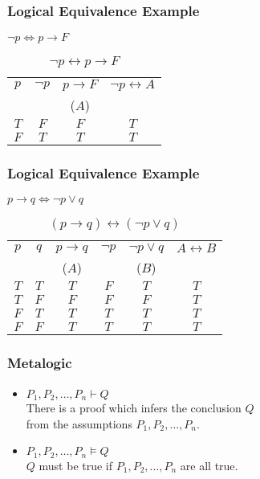 \documentclass[dvipsnames]{beamer}
\begin{document}
\begin{frame}
  \frametitle{Logical Equivalence Example}

  $\neg p \Leftrightarrow p \rightarrow F$

  \begin{table}
    \caption{$\neg p \leftrightarrow p \rightarrow F$}
    \begin{tabular}{|c|c|c||c|}\hline
      $p$ & $\neg p$ & $p \rightarrow F$ & $\neg p \leftrightarrow A$\\
          &          & ($A$)             &\\\hline\hline
      $T$ & $F$ & $F$ & $T$\\\hline
      $F$ & $T$ & $T$ & $T$\\\hline
    \end{tabular}
  \end{table}
\end{frame}

\begin{frame}
  \frametitle{Logical Equivalence Example}

  $p \rightarrow q \Leftrightarrow \neg p \vee q$

  \begin{table}
    \caption{$(p \rightarrow q) \leftrightarrow (\neg p \vee q)$}
    \begin{tabular}{|c|c|c|c|c||c|}\hline
      $p$ & $q$ & $p \rightarrow q$ & $\neg p$ & $\neg p \vee q$ & $A \leftrightarrow B$\\
          &     & ($A$)             &          & ($B$)           &\\\hline\hline
      $T$ & $T$ & $T$ & $F$ & $T$ & $T$\\\hline
      $T$ & $F$ & $F$ & $F$ & $F$ & $T$\\\hline
      $F$ & $T$ & $T$ & $T$ & $T$ & $T$\\\hline
      $F$ & $F$ & $T$ & $T$ & $T$ & $T$\\\hline
    \end{tabular}
  \end{table}
\end{frame}

\begin{frame}
  \frametitle{Metalogic}

  \begin{itemize}
    \item $P_1,P_2,\dots,P_n \vdash Q$\\
      \smallskip
      There is a proof which infers the conclusion $Q$\\
      from the assumptions $P_1,P_2,\dots,P_n$.

    \pause
    \medskip
    \item $P_1,P_2,\dots,P_n \vDash Q$\\
      \smallskip
      $Q$ must be true if $P_1,P_2,\dots,P_n$ are all true.
  \end{itemize}
\end{frame}
\end{document}
